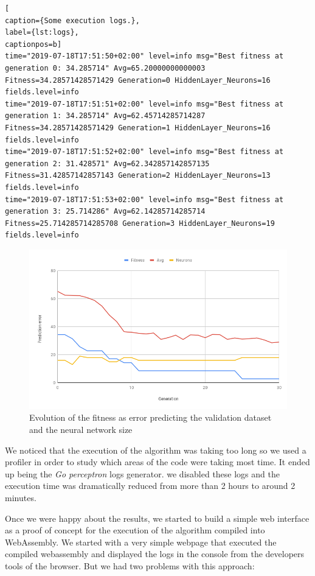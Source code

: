 \begin{lstlisting}[
caption={Some execution logs.},
label={lst:logs},
captionpos=b]
time="2019-07-18T17:51:50+02:00" level=info msg="Best fitness at generation 0: 34.285714" Avg=65.20000000000003 Fitness=34.28571428571429 Generation=0 HiddenLayer_Neurons=16 fields.level=info
time="2019-07-18T17:51:51+02:00" level=info msg="Best fitness at generation 1: 34.285714" Avg=62.45714285714287 Fitness=34.28571428571429 Generation=1 HiddenLayer_Neurons=16 fields.level=info
time="2019-07-18T17:51:52+02:00" level=info msg="Best fitness at generation 2: 31.428571" Avg=62.342857142857135 Fitness=31.42857142857143 Generation=2 HiddenLayer_Neurons=13 fields.level=info
time="2019-07-18T17:51:53+02:00" level=info msg="Best fitness at generation 3: 25.714286" Avg=62.14285714285714 Fitness=25.714285714285708 Generation=3 HiddenLayer_Neurons=19 fields.level=info
\end{lstlisting} 

\begin{figure}[h!]
		\centering
    	\includegraphics[width=\linewidth]{assets/images/milestone1-native-chart.png}
    	\caption{Evolution of the fitness as error predicting the validation dataset and the neural network size}
    	\label{fig:native}
\end{figure} 

We noticed that the execution of the algorithm was taking too long so we used a profiler in order to study which areas of the code were taking most time. It ended up being the \textit{Go perceptron} logs generator. we disabled these logs and the execution time was dramatically reduced from more than 2 hours to around 2 minutes.

Once we were happy about the results, we started to build a simple web interface as a proof of concept for the execution of the algorithm compiled into WebAssembly. We started with a very simple webpage that executed the compiled webassembly and displayed the logs in the console from the developers tools of the browser. But we had two problems with this approach:

